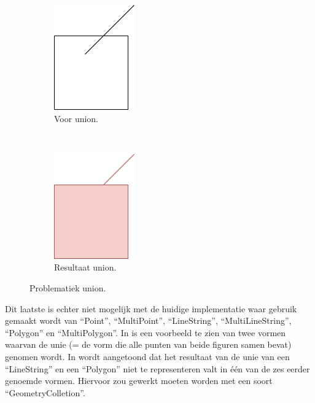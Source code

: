 \begin{figure}
    \centering
    \begin{subfigure}[t]{0.5\linewidth}
        \centering
        \includegraphics[width=0.3\linewidth]{images/union_example1.png}
        \caption{Voor union.}
        \label{fig:union_example1}
    \end{subfigure}%
    ~ 
    \begin{subfigure}[t]{0.5\linewidth}
        \centering
        \includegraphics[width=0.3\linewidth]{images/union_example2.png}
        \caption{Resultaat union.}
        \label{fig:union_example2}
    \end{subfigure}
    \caption{Problematiek union.}
\end{figure}

Dit laatste is echter niet mogelijk met de huidige implementatie waar gebruik gemaakt wordt van ``Point'', ``MultiPoint'', ``LineString'', ``MultiLineString'', ``Polygon'' en ``MultiPolygon''. In  is een voorbeeld te zien van twee vormen waarvan de unie (= de vorm die alle punten van beide figuren samen bevat) genomen wordt. In  wordt aangetoond dat het resultaat van de unie van een ``LineString'' en een ``Polygon'' niet te representeren valt in één van de zes eerder genoemde vormen. Hiervoor zou gewerkt moeten worden met een soort ``GeometryColletion''.